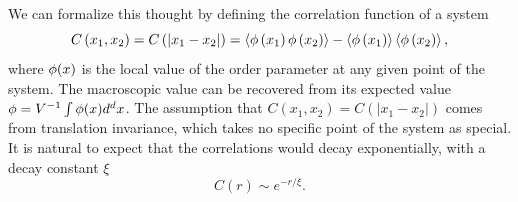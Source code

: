 We can formalize this thought by defining the correlation function of a system
\begin{equation}
    \label{eq:corr}
    C\left(x_{1},x_{2}\right)=
    C\left(\left|x_{1}-x_{2}\right|\right)=
    \left\langle \phi\left(x_{1}\right)\phi\left(x_{2}\right)\right\rangle 
    -\left\langle \phi\left(x_{1}\right)\right\rangle
    \left\langle \phi\left(x_{2}\right)\right\rangle,
\end{equation}
where $\phi(x)$ is the local value of the order parameter at any given point of
the system. The macroscopic value can be recovered from its expected value
$\phi=V^{-1}\int\phi(x)d^d x$. The assumption that
$C\left(x_{1},x_{2}\right)=C\left(\left|x_{1}-x_{2}\right|\right)$ comes from
translation invariance, which takes no specific point of the system as special.
It is natural to expect that the correlations would decay exponentially, with a
decay constant $\xi$
\begin{equation}
    \label{eq:corr}
    C\left(r\right)\sim e^{-r/\xi}.
\end{equation}

